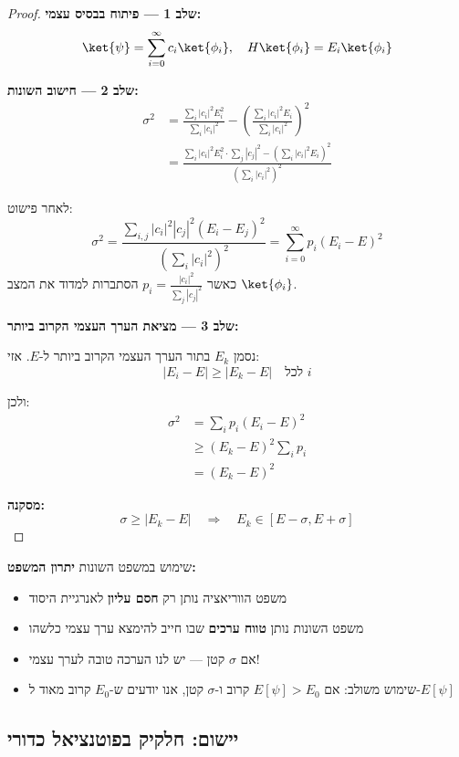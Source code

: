\begin{proof}
\textbf{שלב 1 — פיתוח בבסיס עצמי:}
\[
\ket{\psi} = \sum_{i=0}^{\infty} c_i \ket{\phi_i}, \quad H\ket{\phi_i} = E_i\ket{\phi_i}
\]

\textbf{שלב 2 — חישוב השונות:}
\begin{align*}
\sigma^2 &= \frac{\sum_i |c_i|^2 E_i^2}{\sum_i |c_i|^2} - \left(\frac{\sum_i |c_i|^2 E_i}{\sum_i |c_i|^2}\right)^2 \\
&= \frac{\sum_i |c_i|^2 E_i^2 \cdot \sum_j |c_j|^2 - (\sum_i |c_i|^2 E_i)^2}{(\sum_i |c_i|^2)^2}
\end{align*}

לאחר פישוט:
\[
\sigma^2 = \frac{\sum_{i,j} |c_i|^2|c_j|^2 (E_i - E_j)^2}{(\sum_i |c_i|^2)^2} = \sum_{i=0}^{\infty} p_i (E_i - E)^2
\]
כאשר $p_i = \frac{|c_i|^2}{\sum_j |c_j|^2}$ הסתברות למדוד את המצב $\ket{\phi_i}$.

\textbf{שלב 3 — מציאת הערך העצמי הקרוב ביותר:}

נסמן $E_k$ בתור הערך העצמי הקרוב ביותר ל-$E$. אזי:
\[
|E_i - E| \geq |E_k - E| \quad \text{לכל } i
\]

ולכן:
\begin{align*}
\sigma^2 &= \sum_i p_i (E_i - E)^2 \\
&\geq (E_k - E)^2 \sum_i p_i \\
&= (E_k - E)^2
\end{align*}

\textbf{מסקנה:}
\[
\sigma \geq |E_k - E| \quad \Rightarrow \quad E_k \in [E - \sigma, E + \sigma]
\]
\end{proof}

\begin{importantbox}{שימוש במשפט השונות}
\textbf{יתרון המשפט:}
\begin{itemize}
    \item משפט הווריאציה נותן רק \textbf{חסם עליון} לאנרגיית היסוד
    \item משפט השונות נותן \textbf{טווח ערכים} שבו חייב להימצא ערך עצמי כלשהו
    \item אם $\sigma$ קטן — יש לנו הערכה טובה לערך עצמי!
    \item שימוש משולב: אם $E[\psi] > E_0$ קרוב ו-$\sigma$ קטן, אנו יודעים ש-$E_0$ קרוב מאוד ל-$E[\psi]$
\end{itemize}
\end{importantbox}

\subsection{יישום: חלקיק בפוטנציאל כדורי}

